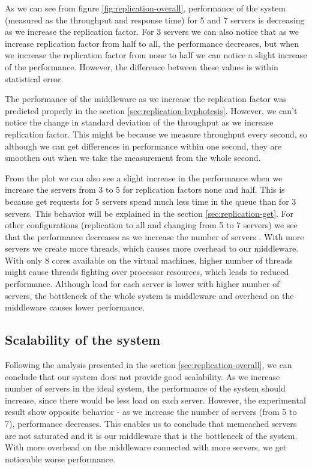 \documentclass[11pt]{article}
\begin{document}
As we can see from figure \ref{fig:replication-overall}, performance of the system (measured as the throughput and response time) for 5 and 7 servers is decreasing as we increase the replication factor. For 3 servers we can also notice that as we increase replication factor from half to all, the performance decreases, but when we increase the replication factor from none to half we can notice a slight increase of the performance. However, the difference between these values is within statistical error.

The performance of the middleware as we increase the replication factor was predicted properly in the section \ref{sec:replication-hyphotesis}. However, we can't notice the change in standard deviation of the throughput as we increase replication factor. This might be because we measure throughput every second, so although we can get differences in performance within one second, they are smoothen out when we take the measurement from the whole second.

From the plot we can also see a slight increase in the performance when we increase the servers from 3 to 5 for replication factors none and half. This is because get requests for 5 servers spend much less time in the queue than for 3 servers. This behavior will be explained in the section \ref{sec:replication-get}. For other configurations (replication to all and changing from 5 to 7 servers) we see that the performance decreases as we increase the number of servers . With more servers we create more threads, which causes more overhead to our middleware. With only 8 cores available on the virtual machines, higher number of threads might cause threads fighting over processor resources, which leads to reduced performance. Although load for each server is lower with higher number of servers, the bottleneck of the whole system is middleware and overhead on the middleware causes lower performance.

\subsection{Scalability of the system}
Following the analysis presented in the section \ref{sec:replication-overall}, we can conclude that our system does not provide good scalability. As we increase number of servers in the ideal system, the performance of the system should increase, since there would be less load on each server. However, the experimental result show opposite behavior - as we increase the number of servers (from 5 to 7), performance decreases. This enables us to conclude that memcached servers are not saturated and it is our middleware that is the bottleneck of the system. With more overhead on the middleware connected with more servers, we get noticeable worse performance.
\end{document}
